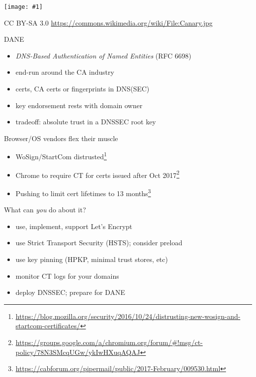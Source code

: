\documentclass[ignorenonframetext,aspectratio=169]{beamer}
\makeatletter
\def\maxwidth{\ifdim\Gin@nat@width>\linewidth\linewidth\else\Gin@nat@width\fi}
\def\maxheight{\ifdim\Gin@nat@height>\textheight0.8\textheight\else\Gin@nat@height\fi}
\newcommand{\includegraphicsscaled}[1]{
    \texttt{[image: \#1]}
}
\makeatother
\begin{document}
\begin{frame}[plain]

\begin{center}
\includegraphicsscaled{Great_Dane_(PSF).png}
\end{center}

\tiny

CC BY-SA 3.0 \url{https://commons.wikimedia.org/wiki/File:Canary.jpg}

\end{frame}

\begin{frame}{DANE}

\begin{itemize}
\item
  \emph{DNS-Based Authentication of Named Entities} (RFC 6698)
\item
  end-run around the CA industry
\item
  certs, CA certs or fingerprints in DNS(SEC)
\item
  key endorsement rests with domain owner
\item
  tradeoff: absolute trust in a DNSSEC root key
\end{itemize}

\end{frame}

\begin{frame}{Browser/OS vendors flex their muscle}

\begin{itemize}
\item WoSign/StartCom distrusted\footnote[frame]{
  \url{https://blog.mozilla.org/security/2016/10/24/distrusting-new-wosign-and-startcom-certificates/}}
\item Chrome to require CT for certs issued after Oct 2017\footnote[frame]{
  \url{https://groups.google.com/a/chromium.org/forum/\#!msg/ct-policy/78N3SMcqUGw/ykIwHXuqAQAJ}}
\item Pushing to limit cert lifetimes to 13 months\footnote{
  \url{https://cabforum.org/pipermail/public/2017-February/009530.html}}
\end{itemize}

\end{frame}

\begin{frame}{What can \emph{you} do about it?}

\begin{itemize}
\item
  use, implement, support Let's Encrypt
\item
  use Strict Transport Security (HSTS); consider preload
\item
  use key pinning (HPKP, minimal trust stores, etc)
\item
  monitor CT logs for your domains
\item
  deploy DNSSEC; prepare for DANE
\end{itemize}

\end{frame}
\end{document}
